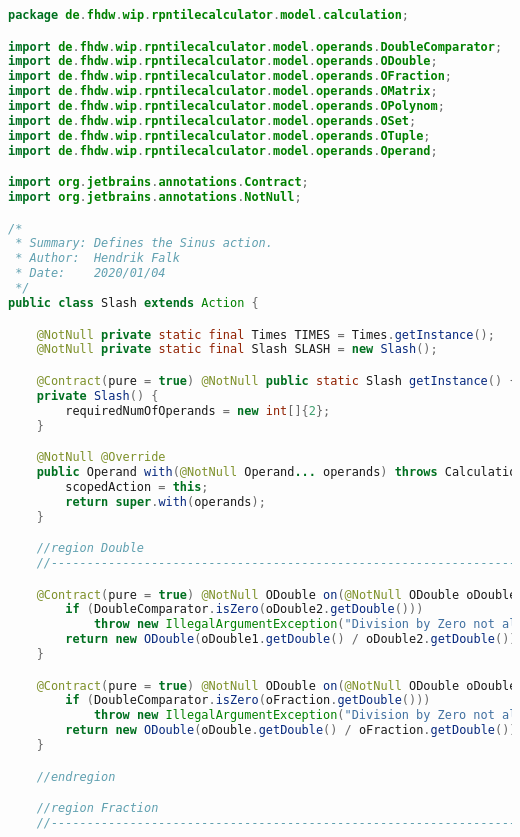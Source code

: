 \begin{lstlisting}[caption=Slash (Falk),label=list:Slash,language=Java]
package de.fhdw.wip.rpntilecalculator.model.calculation;

import de.fhdw.wip.rpntilecalculator.model.operands.DoubleComparator;
import de.fhdw.wip.rpntilecalculator.model.operands.ODouble;
import de.fhdw.wip.rpntilecalculator.model.operands.OFraction;
import de.fhdw.wip.rpntilecalculator.model.operands.OMatrix;
import de.fhdw.wip.rpntilecalculator.model.operands.OPolynom;
import de.fhdw.wip.rpntilecalculator.model.operands.OSet;
import de.fhdw.wip.rpntilecalculator.model.operands.OTuple;
import de.fhdw.wip.rpntilecalculator.model.operands.Operand;

import org.jetbrains.annotations.Contract;
import org.jetbrains.annotations.NotNull;

/*
 * Summary: Defines the Sinus action.
 * Author:  Hendrik Falk
 * Date:    2020/01/04
 */
public class Slash extends Action {

    @NotNull private static final Times TIMES = Times.getInstance();
    @NotNull private static final Slash SLASH = new Slash();

    @Contract(pure = true) @NotNull public static Slash getInstance() { return SLASH; }
    private Slash() {
        requiredNumOfOperands = new int[]{2};
    }

    @NotNull @Override
    public Operand with(@NotNull Operand... operands) throws CalculationException {
        scopedAction = this;
        return super.with(operands);
    }

    //region Double
    //------------------------------------------------------------------------------------

    @Contract(pure = true) @NotNull ODouble on(@NotNull ODouble oDouble1, @NotNull ODouble oDouble2) {
        if (DoubleComparator.isZero(oDouble2.getDouble()))
            throw new IllegalArgumentException("Division by Zero not allowed");
        return new ODouble(oDouble1.getDouble() / oDouble2.getDouble());
    }

    @Contract(pure = true) @NotNull ODouble on(@NotNull ODouble oDouble, @NotNull OFraction oFraction) {
        if (DoubleComparator.isZero(oFraction.getDouble()))
            throw new IllegalArgumentException("Division by Zero not allowed");
        return new ODouble(oDouble.getDouble() / oFraction.getDouble());
    }

    //endregion

    //region Fraction
    //------------------------------------------------------------------------------------


\end{lstlisting}
